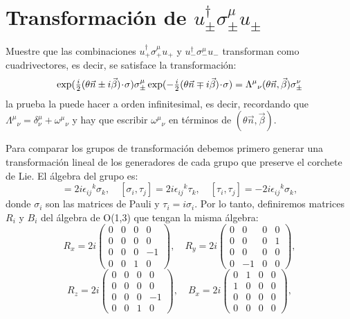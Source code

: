 \section{Transformación de $u_\pm^\dagger\sigma_\pm^\mu u_\pm$}
\begingroup\color{blue}
Muestre que las combinaciones $u_+^\dagger\sigma_+^\mu u_+$ y $u_-^\dagger\sigma_-^\mu u_-$ transforman como cuadrivectores, es decir, se satisface la transformación:
\begin{equation}
\exp(\tfrac i2(\theta \vec n\pm i\vec\beta)\!\cdot\!\sigma)
\sigma_\pm^\mu
\exp(-\tfrac i2(\theta \vec n\mp i\vec\beta)\!\cdot\!\sigma)
=\Lambda^\mu{_\nu}(\theta \vec n,\vec \beta)\sigma_\pm^\nu
\end{equation}
la prueba la puede hacer a orden infinitesimal, es decir, recordando que $\Lambda^\mu{}_\nu=\delta_\nu^\mu+\omega^\mu{}_\nu$ y hay que escribir $\omega^\mu{}_\nu$ en términos de $(\theta\vec n,\vec \beta)$.
\endgroup
\par Para comparar los grupos de transformación debemos primero generar una transformación lineal de los generadores de cada grupo que preserve el corchete de Lie. El álgebra del grupo \gldc es:
\begin{equation}
[\sigma_i,\sigma_j]=2i\epsilon_{ij}{}^k\sigma_k,
\quad
[\sigma_i,\tau_j]=2i\epsilon_{ij}{}^k\tau_k,
\quad
[\tau_i,\tau_j]=-2i\epsilon_{ij}{}^k\sigma_k,
\end{equation}
donde $\sigma_i$ son las matrices de Pauli y $\tau_i=i\sigma_i$.
Por lo tanto, definiremos matrices $R_i$ y $B_i$ del álgebra de O(1,3) que tengan la misma álgebra:
\begin{equation*}
R_x=2i\begin{pmatrix}
0&0&0&0\\
0&0&0&0\\
0&0&0&-1\\
0&0&1&0
\end{pmatrix},\quad
R_y=2i\begin{pmatrix}
0&0&0&0\\
0&0&0&1\\
0&0&0&0\\
0&-1&0&0
\end{pmatrix},
\end{equation*}
\begin{equation}
R_z=2i\begin{pmatrix}
0&0&0&0\\
0&0&0&0\\
0&0&0&-1\\
0&0&1&0
\end{pmatrix},\quad
B_x=2i\begin{pmatrix}
0&1&0&0\\
1&0&0&0\\
0&0&0&0\\
0&0&0&0
\end{pmatrix},
\end{equation}
